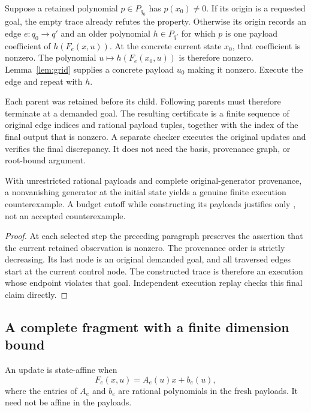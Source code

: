 Suppose a retained polynomial $p\in P_{q_0}$ has $p(x_0)\ne0$. If its origin
is a requested goal, the empty trace already refutes the property. Otherwise
its origin records an edge $e:q_0\to q'$ and an older polynomial $h\in P_{q'}$
for which $p$ is one payload coefficient of $h(F_e(x,u))$. At the concrete
current state $x_0$, that coefficient is nonzero. The polynomial
$u\mapsto h(F_e(x_0,u))$ is therefore nonzero. Lemma~\ref{lem:grid} supplies a
concrete payload $u_0$ making it nonzero. Execute the edge and repeat with $h$.

Each parent was retained before its child. Following parents must therefore
terminate at a demanded goal. The resulting certificate is a finite sequence
of original edge indices and rational payload tuples, together with the index
of the final output that is nonzero. A separate checker executes the original
updates and verifies the final discrepancy. It does not need the basis,
provenance graph, or root-bound argument.

\begin{proposition}
With unrestricted rational payloads and complete original-generator provenance,
a nonvanishing generator at the initial state yields a genuine finite
execution counterexample. A budget cutoff while constructing its payloads
justifies only \unknown{}, not an accepted counterexample.
\end{proposition}
\begin{proof}
At each selected step the preceding paragraph preserves the assertion that
the current retained observation is nonzero. The provenance order is strictly
decreasing. Its last node is an original demanded goal, and all traversed
edges start at the current control node. The constructed trace is therefore
an execution whose endpoint violates that goal. Independent execution replay
checks this final claim directly.
\end{proof}

\subsection{A complete fragment with a finite dimension bound}
\begin{definition}
An update is state-affine when
\[
 F_e(x,u)=A_e(u)x+b_e(u),
\]
where the entries of $A_e$ and $b_e$ are rational polynomials in the fresh
payloads. It need not be affine in the payloads.
\end{definition}

